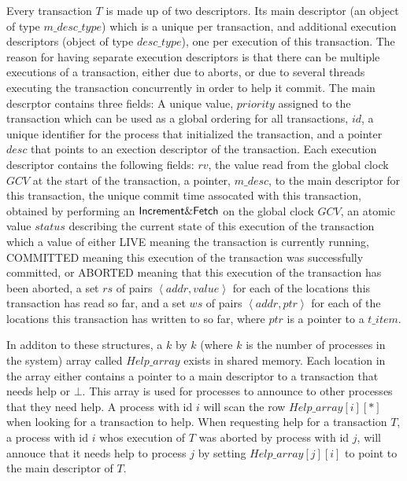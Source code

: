 \documentclass[runningheads,a4paper]{llncs}
\newcommand{\tuple}[1]{\ensuremath{\left \langle #1 \right \rangle }}
\begin{document}
Every transaction $T$ is made up of two descriptors.
Its main descriptor (an object of type $\mathit{m\_desc\_type}$) which is a unique per transaction, and additional
execution descriptors (object of type $\mathit{desc\_type}$), one per execution of this transaction.
The reason for having separate execution descriptors is that there can be multiple executions of a transaction,
either due to aborts, or due to several threads executing the transaction concurrently in order to help it commit.
The main descrptor contains three fields:
A unique value, $\mathit{priority}$ assigned to the transaction which can be used as a global ordering for all transactions,
$\mathit{id}$, a unique identifier for the process that initialized the transaction, and a pointer $\mathit{desc}$ that points
to an exection descriptor of the transaction.
Each execution descriptor contains the following fields:
$\mathit{rv}$, the value read from the global clock $\mathit{GCV}$ at the start of the transaction,
a pointer, $\mathit{m\_desc}$, to the main descriptor for this transaction,
the unique commit time assocated with this transaction, obtained by performing an ${\sf Increment\&Fetch}$ on the global
clock $\mathit{GCV}$,
an atomic value $\mathit{status}$ describing the current state of this execution of the transaction which a value of either
LIVE meaning the transaction is currently running, COMMITTED meaning this execution of the transaction was successfully committed,
or ABORTED meaning that this execution of the transaction has been aborted,
a set $\mathit{rs}$ of pairs $\tuple{\mathit{addr,value}}$ for each of the locations this transaction has read so far,
and a set $\mathit{ws}$ of pairs $\tuple{\mathit{addr,ptr}}$ for each of the locations this transaction has written to so far, where $\mathit{ptr}$ is 
a pointer to a $\mathit{t\_item}$.

In additon to these structures, a $\mathit{k}$ by $\mathit{k}$ (where $\mathit{k}$ is the number of processes in the system)
array called $\mathit{Help\_array}$ exists in shared memory.
Each location in the array either contains a pointer to a main descriptor to a transaction that needs help or $\bot$.
This array is used for processes to announce to other processes that they need help.
A process with id $\mathit{i}$ will scan the row $\mathit{Help\_array}[\mathit{i}][\mathit{*}]$ when looking for a transaction to help.
When requesting help for a transaction $T$, a process with id $\mathit{i}$ whos execution of $T$ was aborted by process with id $\mathit{j}$, will
annouce that it needs help to process $\mathit{j}$ by setting $\mathit{Help\_array}[\mathit{j}][\mathit{i}]$ to point to the main descriptor of $T$.
\end{document}
